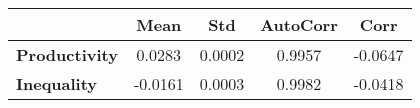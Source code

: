\begin{tiny}\begin{tabular}{|l|c|c|c|c|}
\hline
&\textbf{Mean}&\textbf{Std}&\textbf{AutoCorr}&\textbf{Corr}\\\hline
\textbf{Productivity}&0.0283&0.0002&0.9957&-0.0647\\\hline
\textbf{Inequality}&-0.0161&0.0003&0.9982&-0.0418\\\hline
\end{tabular}
\end{tiny}